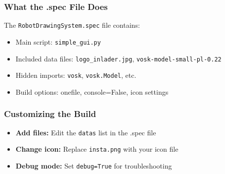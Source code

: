 \documentclass[a4paper,12pt]{article}
\begin{document}
\subsubsection{What the .spec File Does}
The \texttt{RobotDrawingSystem.spec} file contains:
\begin{itemize}
\item Main script: \texttt{simple\_gui.py}
\item Included data files: \texttt{logo\_inlader.jpg}, \texttt{vosk-model-small-pl-0.22}
\item Hidden imports: \texttt{vosk}, \texttt{vosk.Model}, etc.
\item Build options: onefile, console=False, icon settings
\end{itemize}

\subsubsection{Customizing the Build}
\begin{itemize}
\item \textbf{Add files:} Edit the \texttt{datas} list in the .spec file
\item \textbf{Change icon:} Replace \texttt{insta.png} with your icon file
\item \textbf{Debug mode:} Set \texttt{debug=True} for troubleshooting
\end{itemize}
\end{document}
